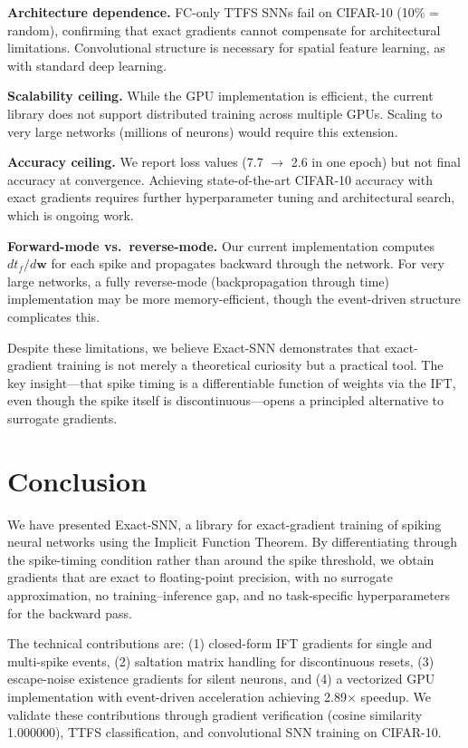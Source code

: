 \documentclass[10pt,twocolumn]{article}
\begin{document}
\textbf{Architecture dependence.} FC-only TTFS SNNs fail on CIFAR-10 (10\% = random), confirming that exact gradients cannot compensate for architectural limitations. Convolutional structure is necessary for spatial feature learning, as with standard deep learning.

\textbf{Scalability ceiling.} While the GPU implementation is efficient, the current library does not support distributed training across multiple GPUs. Scaling to very large networks (millions of neurons) would require this extension.

\textbf{Accuracy ceiling.} We report loss values (7.7 $\to$ 2.6 in one epoch) but not final accuracy at convergence. Achieving state-of-the-art CIFAR-10 accuracy with exact gradients requires further hyperparameter tuning and architectural search, which is ongoing work.

\textbf{Forward-mode vs.\ reverse-mode.} Our current implementation computes $dt_f/d\mathbf{w}$ for each spike and propagates backward through the network. For very large networks, a fully reverse-mode (backpropagation through time) implementation may be more memory-efficient, though the event-driven structure complicates this.

Despite these limitations, we believe Exact-SNN demonstrates that exact-gradient training is not merely a theoretical curiosity but a practical tool. The key insight---that spike timing is a differentiable function of weights via the IFT, even though the spike itself is discontinuous---opens a principled alternative to surrogate gradients.

\section{Conclusion}

We have presented Exact-SNN, a library for exact-gradient training of spiking neural networks using the Implicit Function Theorem. By differentiating through the spike-timing condition rather than around the spike threshold, we obtain gradients that are exact to floating-point precision, with no surrogate approximation, no training--inference gap, and no task-specific hyperparameters for the backward pass.

The technical contributions are: (1) closed-form IFT gradients for single and multi-spike events, (2) saltation matrix handling for discontinuous resets, (3) escape-noise existence gradients for silent neurons, and (4) a vectorized GPU implementation with event-driven acceleration achieving 2.89$\times$ speedup. We validate these contributions through gradient verification (cosine similarity 1.000000), TTFS classification, and convolutional SNN training on CIFAR-10.
\end{document}
